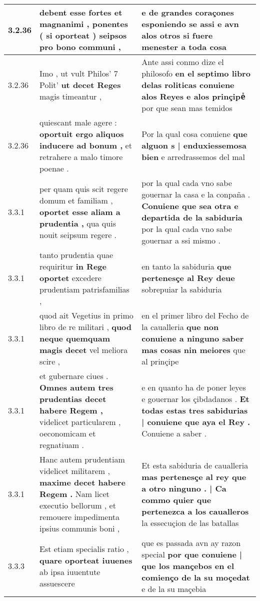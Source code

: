 \begin{tabular}{|p{1cm}|p{6.5cm}|p{6.5cm}|}
3.2.36 & debent esse fortes et magnanimi , \textbf{ ponentes ( si oporteat ) } seipsos pro bono communi , & e de grandes coraçones esponiendo se assi \textbf{ e avn alos otros } si fuere menester a toda cosa \\\hline
3.2.36 & Imo , ut vult Philos’ 7 Polit’ \textbf{ ut decet Reges } magis timeantur , & Ante assi conmo dize el philosofo \textbf{ en el septimo libro delas roliticas conuiene alos Reyes e alos prinçipeᷤ } por que sean mas temidos \\\hline
3.2.36 & quiescant male agere : \textbf{ oportuit ergo aliquos inducere ad bonum , } et retrahere a malo timore poenae . & Por la qual cosa conuiene \textbf{ que alguon s | enduxiessemosa bien } e arredrassemos del mal \\\hline
3.3.1 & per quam quis scit regere domum et familiam , \textbf{ oportet esse aliam a prudentia , } qua quis nouit seipsum regere . & por la qual cada vno sabe gouernar la casa e la conpaña . \textbf{ Conuiene que sea otra e departida de la sabiduria } por la qual cada vno sabe gouernar a ssi mismo . \\\hline
3.3.1 & tanto prudentia quae requiritur \textbf{ in Rege oportet } excedere prudentiam patrisfamilias , & en tanto la sabiduria \textbf{ que pertenesçe al Rey deue } sobrepuiar la sabiduria \\\hline
3.3.1 & quod ait Vegetius in primo libro de re militari , \textbf{ quod neque quemquam magis decet } vel meliora scire , & en el primer libro del Fecho de la caualleria \textbf{ que non conuiene a ninguno saber mas cosas nin meiores } que al prinçipe \\\hline
3.3.1 & et gubernare ciues . \textbf{ Omnes autem tres prudentias decet habere Regem , } videlicet particularem , oeconomicam et regnatiuam . & e en quanto ha de poner leyes e gouernar los çibdadanos . \textbf{ Et todas estas tres sabidurias | conuiene que aya el Rey . } Conuiene a saber . \\\hline
3.3.1 & Hanc autem prudentiam videlicet militarem , \textbf{ maxime decet habere Regem . } Nam licet executio bellorum , et remouere impedimenta ipsius communis boni , & Et esta sabiduria de caualleria \textbf{ mas pertenesçe al rey que a otro ninguno . | Ca commo quier que pertenezca a los caualleros } la essecuçion de las batallas \\\hline
3.3.3 & Est etiam specialis ratio , \textbf{ quare oporteat iuuenes } ab ipsa iuuentute assuescere & que es passada avn ay razon special \textbf{ por que conuiene | que los mançebos en el comienço de la su moçedat } e de la su maçebia \\\hline

\end{tabular}
